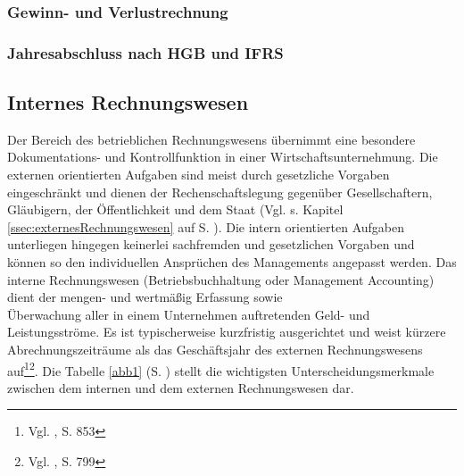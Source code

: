 \subsubsection{Gewinn- und Verlustrechnung}

\subsubsection{Jahresabschluss nach HGB und IFRS}

\subsection{Internes Rechnungswesen}
\label{ssec:internesRechnungswesen}

Der Bereich des betrieblichen Rechnungswesens übernimmt eine besondere Dokumentations- und Kontrollfunktion in einer Wirtschaftsunternehmung.
Die externen orientierten Aufgaben sind meist durch gesetzliche Vorgaben eingeschränkt und dienen der Rechenschaftslegung gegenüber Gesellschaftern, Gläubigern, der Öffentlichkeit und dem Staat (Vgl. s. Kapitel \ref{ssec:externesRechnungswesen} auf S. \pageref{ssec:externesRechnungswesen}).
Die intern orientierten Aufgaben unterliegen hingegen keinerlei sachfremden und gesetzlichen Vorgaben und können so den individuellen Ansprüchen des Managements angepasst werden. Das interne Rechnungswesen (Betriebsbuchhaltung oder Management Accounting) dient der mengen- und wertmäßig Erfassung sowie\\ Überwachung aller in einem Unternehmen auftretenden Geld- und Leistungsströme. Es ist typischerweise kurzfristig ausgerichtet und weist kürzere Abrechnungszeiträume als das Geschäftsjahr des externen Rechnungswesens auf\footnote{Vgl. \cite{Wohe2000}, S. 853}\footnote{Vgl. \cite{Schierenbeck2008}, S. 799}.
Die Tabelle \ref{abb1} (S. \pageref{abb1}) stellt die wichtigsten Unterscheidungsmerkmale zwischen dem internen und dem externen Rechnungswesen dar.\\
